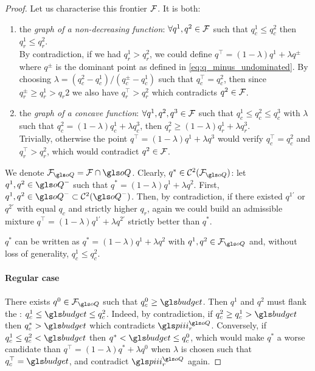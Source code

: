 \begin{proof}
    Let us characterise this frontier $\mathcal{F}$. It is both:
    \begin{enumerate}
        \item the \emph{graph of a non-decreasing function}: $\forall q^1, q^2\in\mathcal{F}$ such that $q_c^1\leq q_c^2$ then $q_r^1\leq q_r^2$.\\
        By contradiction, if we had $q_r^1 > q_r^2$, we could define $q^\top = (1-\lambda)q^1 + \lambda q^\pm$ where $q^\pm$ is the dominant point as defined in \eqref{eq:q_minus_undominated}. By choosing $\lambda=(q^2_c-q^1_c)/(q^\pm_c-q^1_c)$ such that $q^\top_c = q_c^2$, then since $q_r^\pm \geq q_r^1 > q_r 2$ we also have $q^\top_r > q_r^2$ which contradicts $q^2\in\mathcal{F}$.
        \item the \emph{graph of a concave function}: $\forall q^1, q^2, q^3\in\mathcal{F}$ such that $q_c^1\leq q_c^2 \leq q_c^3$ with $\lambda$ such that $q^2_c = (1-\lambda)q^1_c + \lambda q^3_c$, then $q_r^2 \geq (1-\lambda)q_r^1 + \lambda q_r^3$.\\
        Trivially, otherwise the point $q^\top = (1-\lambda)q^1 + \lambda q^3$ would verify $q^\top_c=q^2_c$ and $q^\top_r > q^2_r$, which would contradict $q^2 \in\mathcal{F}$.
    \end{enumerate}

    We denote $\cF_{\oQ} = \cF \cap \oQ$. Clearly, $q^*\in\cC^2(\cF_{\oQ})$: let $q^1, q^2\in \oQ^-$ such that $q^* = (1-\lambda)q^1 + \lambda q^2$. First, $q^1, q^2\in \oQ^-\subset\cC^2(\oQ^-)$. Then, by contradiction, if there existed $q^{1'}$ or $q^{2'}$ with equal $q_c$ and strictly higher $q_r$, again we could build an admissible mixture $q^{\top}=(1-\lambda)q^{1'}  + \lambda q^{2'}$ strictly better than $q^*$.

    $q^*$ can be written as $q^* = (1-\lambda)q^1 + \lambda q^2$ with $q^1, q^2\in\cF_{\oQ}$ and, without loss of generality, $q^1_c \leq q^2_c$.

    \paragraph{Regular case}

    There exists $q^0\in\cF_{\oQ}$ such that $q^0_c \geq \budget$. Then $q^1$ and $q^2$ must flank the : $q_c^1 \leq \budget \leq q_c^2$. Indeed, by contradiction, if $q_c^2 \geq q_c^1 > \budget$ then $q_c^* > \budget$ which contradicts $\policies_r^{\oQ}$. Conversely, if $q_c^1 \leq q_c^2 < \budget$ then $q^* < \budget \leq q^0_c$, which would make $q^*$ a worse candidate than $q^\top=(1-\lambda)q^* + \lambda q^0$ when $\lambda$ is chosen such that $q_c^\top=\budget$, and contradict $\policies_r^{\oQ}$ again.


\end{proof}
